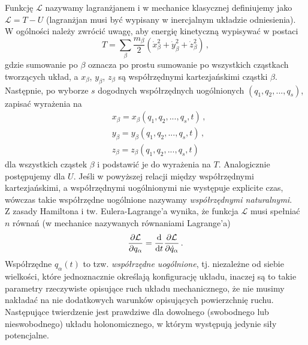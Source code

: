 \documentclass[../main.tex]{subfiles}
\begin{document}
\noindent{}
\medskip

Funkcję \(\mathcal{L}\) nazywamy lagranżjanem i w mechanice klasycznej definiujemy jako \(\mathcal{L}=T-U\) (lagranżjan musi być wypisany w inercjalnym układzie odniesienia). W ogólności należy zwrócić uwagę, aby energię kinetyczną wypisywać w postaci
\begin{equation*}
    T=\sum_\beta \frac{m_\beta}{2}(\dot{x}_\beta^2+\dot{y}_\beta^2+\dot{z}_\beta^2)\,,
\end{equation*}
gdzie sumowanie po \(\beta\) oznacza po prostu sumowanie po wszystkich cząstkach tworzących układ, a \(x_\beta\), \(y_\beta\), \(z_\beta\) są współrzędnymi kartezjańskimi cząstki \(\beta\). Następnie, po wyborze \(s\) dogodnych współrzędnych uogólnionych \((q_1,q_2,...,q_s)\), zapisać wyrażenia na
\begin{equation*}
\begin{split}
    &x_\beta=x_\beta(q_1,q_2,...,q_s,t)\,,\\
    &y_\beta=y_\beta(q_1,q_2,...,q_s,t)\,,\\
    &z_\beta=z_\beta(q_1,q_2,...,q_s,t)
\end{split}
\end{equation*}
dla wszystkich cząstek \(\beta\) i podstawić je do wyrażenia na \(T\). Analogicznie postępujemy dla \(U\). Jeśli w powyższej relacji między współrzędnymi kartezjańskimi, a współrzędnymi uogólnionymi nie występuje explicite czas, wówczas takie współrzędne uogólnione nazywamy \textit{współrzędnymi naturalnymi}.\\
Z zasady Hamiltona i tw. Eulera-Lagrange'a wynika, że funkcja \(\mathcal{L}\) musi spełniać \(n\) równań (w mechanice nazywanych równaniami Lagrange'a)
\begin{equation*}
    \frac{\partial\mathcal{L}}{\partial q_\alpha}=\dv{}{t}\frac{\partial \mathcal{L}}{\partial \dot{q}_\alpha}\,.
\end{equation*}
Współrzędne \(q_\alpha(t)\) to tzw. \textit{współrzędne uogólnione}, tj. niezależne od siebie wielkości, które jednoznacznie określają konfigurację układu, inaczej są to takie parametry rzeczywiste opisujące ruch układu mechanicznego, że nie musimy nakładać na nie dodatkowych warunków opisujących powierzchnię ruchu. Następujące twierdzenie jest prawdziwe dla dowolnego (swobodnego lub nieswobodnego) układu holonomicznego, w którym występują jedynie siły potencjalne.
\medskip
\end{document}
